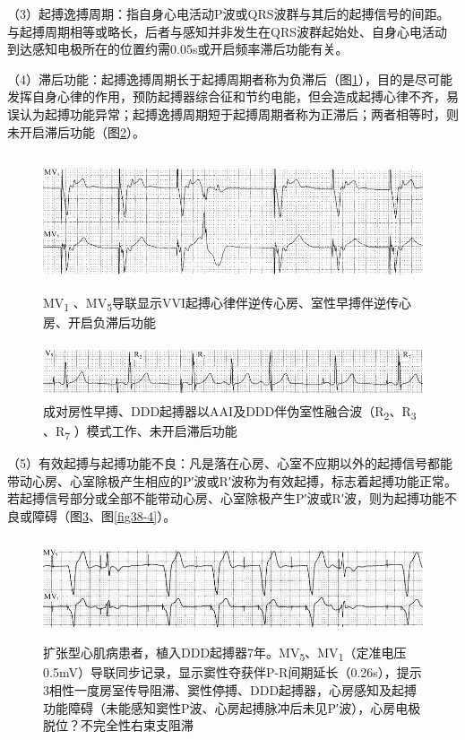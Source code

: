 （3）起搏逸搏周期：指自身心电活动P波或QRS波群与其后的起搏信号的间距。与起搏周期相等或略长，后者与感知并非发生在QRS波群起始处、自身心电活动到达感知电极所在的位置约需0.05s或开启频率滞后功能有关。

（4）滞后功能：起搏逸搏周期长于起搏周期者称为负滞后（图\ref{fig38-1}），目的是尽可能发挥自身心律的作用，预防起搏器综合征和节约电能，但会造成起搏心律不齐，易误认为起搏功能异常；起搏逸搏周期短于起搏周期者称为正滞后；两者相等时，则未开启滞后功能（图\ref{fig38-2}）。

\begin{figure}[!htbp]
 \centering
 \includegraphics[width=5.58333in,height=1.58333in]{./images/Image00604.jpg}
 \captionsetup{justification=centering}
 \caption{MV\textsubscript{1} 、MV\textsubscript{5}导联显示VVI起搏心律伴逆传心房、室性早搏伴逆传心房、开启负滞后功能}
 \label{fig38-1}
  \end{figure} 


\begin{figure}[!htbp]
 \centering
 \includegraphics[width=5.58333in,height=0.63542in]{./images/Image00605.jpg}
 \captionsetup{justification=centering}
 \caption{成对房性早搏、DDD起搏器以AAI及DDD伴伪室性融合波（R\textsubscript{2}、R\textsubscript{3} 、R\textsubscript{7} ）模式工作、未开启滞后功能}
 \label{fig38-2}
  \end{figure} 


（5）有效起搏与起搏功能不良：凡是落在心房、心室不应期以外的起搏信号都能带动心房、心室除极产生相应的P′波或R′波称为有效起搏，标志着起搏功能正常。若起搏信号部分或全部不能带动心房、心室除极产生P′波或R′波，则为起搏功能不良或障碍（图\ref{fig38-3}、图\ref{fig38-4}）。

\begin{figure}[!htbp]
 \centering
 \includegraphics[width=5.58333in,height=1.1875in]{./images/Image00606.jpg}
 \captionsetup{justification=centering}
 \caption{扩张型心肌病患者，植入DDD起搏器7年。MV\textsubscript{5}、MV\textsubscript{1}（定准电压0.5mV）导联同步记录，显示窦性夺获伴P-R间期延长（0.26s），提示3相性一度房室传导阻滞、窦性停搏、DDD起搏器，心房感知及起搏功能障碍（未能感知窦性P波、心房起搏脉冲后未见P′波），心房电极脱位？不完全性右束支阻滞}
 \label{fig38-3}
  \end{figure} 


